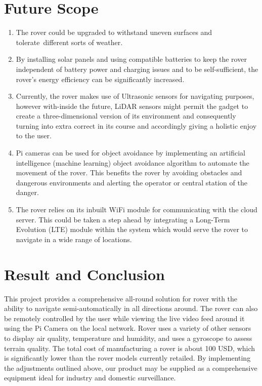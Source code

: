 \documentclass[conference,a4paper]{IEEEtran}
\begin{document}
\section{Future Scope}
\begin{enumerate}
    \item The rover could be upgraded to withstand uneven surfaces and tolerate different sorts of weather.
    \item By installing solar panels and using compatible batteries to keep the rover independent of battery power and charging issues and to be self-sufficient, the rover's energy efficiency can be significantly increased.
    \item Currently, the rover makes use of Ultrasonic sensors for navigating purposes, however with-inside the future, LiDAR sensors might permit the gadget to create a three-dimensional version of its environment and consequently turning into extra correct in its course and accordingly giving a holistic enjoy to the user.
    \item Pi cameras can be used for object avoidance by implementing an artificial intelligence (machine learning) object avoidance algorithm to automate the movement of the rover. This benefits the rover by avoiding obstacles and dangerous environments and alerting the operator or central station of the danger.
    \item The rover relies on its inbuilt WiFi module for communicating with the cloud server. This could be taken a step ahead by integrating a Long-Term Evolution (LTE) module within the system which would serve the rover to navigate in a wide range of locations.

\end{enumerate}
\section{Result and Conclusion}
This project provides a comprehensive all-round solution for  rover with the ability to navigate semi-automatically in all directions around. The rover can also be remotely controlled by the user while viewing the live video feed around it using the Pi Camera on the local network. Rover uses a variety of other sensors to display air quality, temperature and humidity, and uses a gyroscope to assess terrain quality. The total cost of manufacturing a rover is about 100 USD, which is significantly lower than the rover models currently retailed. By implementing the adjustments outlined above, our product may be supplied as a comprehensive equipment ideal for industry and domestic surveillance.
\end{document}
